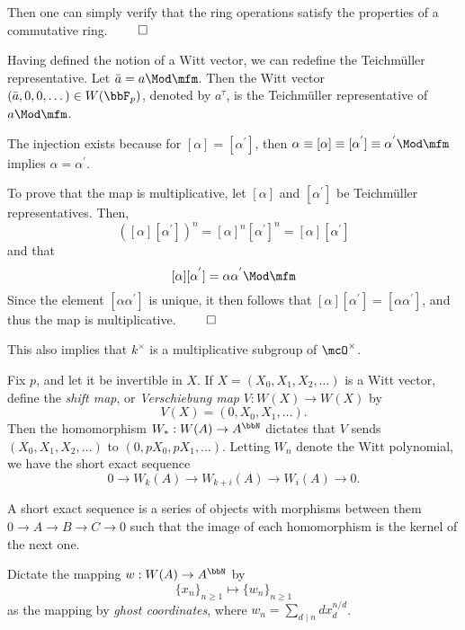 \documentclass[a4paper, 12pt,oneside,openany]{book}
\begin{document}
Then one can simply verify that the ring operations satisfy the properties of a commutative ring. $\qed$

Having defined the notion of a Witt vector, we can redefine the Teichmüller representative. Let $\bar{a}=a \Mod \mfm$. Then the Witt vector $(\bar{a}, 0, 0, \dots) \in W(\bbF_p)$, denoted by $a^{\tau}$, is the Teichmüller representative of $a \Mod \mfm$.


 The injection exists because for $[\alpha]=[\alpha^{'}]$, then $\alpha \equiv [\alpha] \equiv [\alpha^{'}] \equiv \alpha^{'} \Mod\mfm$ implies $\alpha = \alpha^{'}.$

To prove that the map is multiplicative, let $[\alpha]$ and $[\alpha^{'}]$ be Teichmüller representatives. Then, $$([\alpha][\alpha^{'}])^n=[\alpha]^n[\alpha^{'}]^n=[\alpha][\alpha^{'}]$$ and that $$[\alpha][\alpha^{'}]=\alpha \alpha^{'} \Mod\mfm$$ Since the element $[\alpha \alpha^{'}]$ is unique, it then follows that $[\alpha][\alpha^{'}]=[\alpha \alpha^{'}]$, and thus the map is multiplicative. $\qed$

This also implies that $k^\times$ is a multiplicative subgroup of $\mcO^\times$. 

Fix $p$, and let it be invertible in $X$. If $X=(X_0, X_1, X_2, \dots)$ is a Witt vector, define the \emph{shift map}, or \emph{Verschiebung map} $V: W(X) \to W(X)$ by $$V(X)=(0, X_0, X_1, \dots).$$ Then the homomorphism $W_*: W(A) \to A^{\bbN}$ dictates that $V$ sends $(X_0, X_1, X_2, \dots)$ to $(0, pX_0, pX_1, \dots)$. Letting $W_n$ denote the Witt polynomial, we have the short exact sequence $$0 \to W_k(A) \to W_{k+i}(A) \to W_i(A) \to 0.$$

A short exact sequence is a series of objects with morphisms between them $0 \to A \to B \to C \to 0$ such that the image of each homomorphism is the kernel of the next one. 

Dictate the mapping $w:W(A)\to A^{\bbN}$ by $$\{x_n\}_{n\geq 1} \mapsto \{w_n\}_{n\geq 1}$$ as the mapping by \emph{ghost coordinates}, where $w_n=\sum\limits_{d \mid n} dx_d^{n/d}$. 

\end{document}
